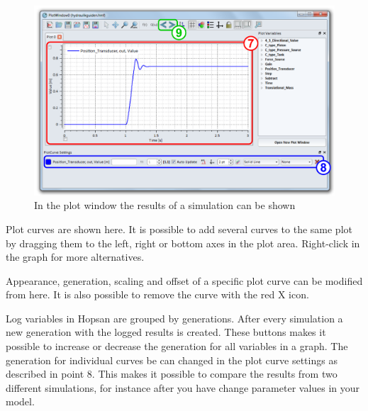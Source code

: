 \documentclass[a4paper,pdftex]{article}
\begin{document}
\begin{tutenumerate}
\begin{figure}[ht]
  \centering
  \includegraphics[width=\textwidth]{gfx/screenshot-plot.pdf}
  \caption{In the plot window the results of a simulation can be shown}
  \label{fig:hopsan_plotwindow}
\end{figure}

Plot curves are shown here.
It is possible to add several curves to the same plot by dragging them to the left, right or bottom axes in the plot area.
Right-click in the graph for more alternatives.

Appearance, generation, scaling and offset of a specific plot curve can be modified from here.
It is also possible to remove the curve with the red X icon.

Log variables in Hopsan are grouped by generations.
After every simulation a new generation with the logged results is created.
These buttons makes it possible to increase or decrease the generation for all variables in a graph.
The generation for individual curves be can changed in the plot curve settings as described in point 8.
This makes it possible to compare the results from two different simulations, for instance after you have change parameter values in your model.
 
\end{tutenumerate}
\vfill
\end{document}
